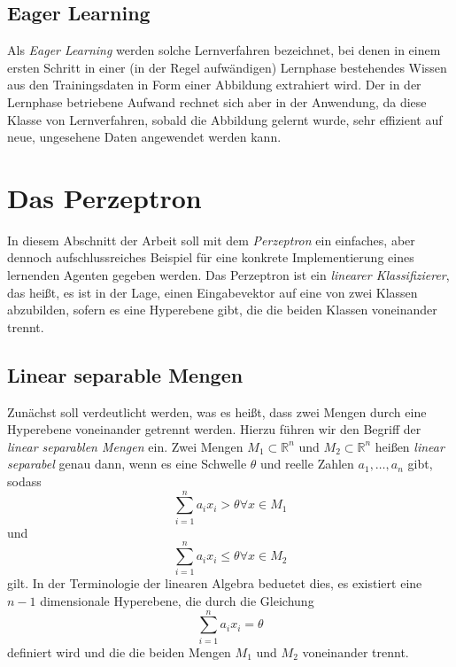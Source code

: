 \documentclass[fontsize=11pt]{scrartcl}
\begin{document}
            \subsection{Eager Learning}
                Als \emph{Eager Learning} werden solche Lernverfahren bezeichnet, bei denen in einem ersten Schritt in einer (in der Regel aufwändigen) Lernphase bestehendes Wissen aus den Trainingsdaten in Form einer Abbildung extrahiert wird.
                Der in der Lernphase betriebene Aufwand rechnet sich aber in der Anwendung, da diese Klasse von Lernverfahren, sobald die Abbildung gelernt wurde, sehr effizient auf neue, ungesehene Daten angewendet werden kann.\cite{ertel2016} 

        \section{Das Perzeptron}
        \label{sec:perzeptron}
            In diesem Abschnitt der Arbeit soll mit dem \emph{Perzeptron} ein einfaches, aber dennoch aufschlussreiches Beispiel für eine konkrete Implementierung eines lernenden Agenten gegeben werden.
            \newline
            Das Perzeptron ist ein \emph{linearer Klassifizierer}, das heißt, es ist in der Lage, einen Eingabevektor auf eine von zwei Klassen abzubilden, sofern es eine Hyperebene gibt, die die beiden Klassen voneinander trennt.\cite{ertel2016}

            \subsection{Linear separable Mengen}
            \label{subsec:lernverfahren}
                Zunächst soll verdeutlicht werden, was es heißt, dass zwei Mengen durch eine Hyperebene voneinander getrennt werden.
                Hierzu führen wir den Begriff der 
                \emph{linear separablen Mengen} ein.
                \newline
                Zwei Mengen $M_1 \subset \mathbb{R}^n$ und $M_2 \subset \mathbb{R}^n$ heißen \emph{linear separabel} genau dann, wenn es eine Schwelle $\theta$ und reelle Zahlen $a_1,\dots,a_n$ gibt, sodass
                $$
                    \sum_{i=1}^n a_ix_i > \theta \forall x \in M_1$$
                und
                $$\sum_{i=1}^n a_ix_i \leq \theta \forall x \in M_2$$
                gilt.\cite{ertel2016}
                \newline
                In der Terminologie der linearen Algebra beduetet dies, es existiert eine $n-1$ dimensionale Hyperebene, die durch die Gleichung
                $$
                    \sum_{i=1}^n a_ix_i = \theta
                $$
                definiert wird und die die beiden Mengen $M_1$ und $M_2$ voneinander trennt.
\end{document}

